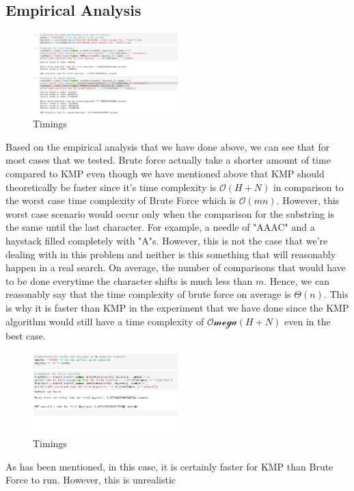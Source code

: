 \subsection*{Empirical Analysis}

\begin{figure}[h!]
    \centering
    \includegraphics[width=0.50\textwidth]{images/jupyter.png}
    \caption{Timings}
\end{figure}

Based on the empirical analysis that we have done above, we can see that for most cases that we tested. Brute force actually take a shorter amount of time compared to KMP even though we have mentioned above that KMP should theoretically be faster since it's time complexity is $\mathcal{O}(H+N)$ in comparison to the worst case time complexity of Brute Force which is $\mathcal{O}(mn)$. However, this worst case scenario would occur only when the comparison for the substring is the same until the last character. For example, a needle of "AAAC" and a haystack filled completely with "A"s. However, this is not the case that we're dealing with in this problem and neither is this something that will reasonably happen in a real search. On average, the number of comparisons that would have to be done everytime the character shifts is much less than $m$. Hence, we can reasonably say that the time complexity of brute force on average is $\Theta(n)$. This is why it is faster than KMP in the experiment that we have done since the KMP algorithm would still have a time complexity of $\mathcal{Omega}(H+N)$ even in the best case.

\begin{figure}[h!]
    \centering
    \includegraphics[width=0.50\textwidth]{images/worst_case.png}
    \caption{Timings}
\end{figure}

As has been mentioned, in this case, it is certainly faster for KMP than Brute Force to run. However, this is unrealistic